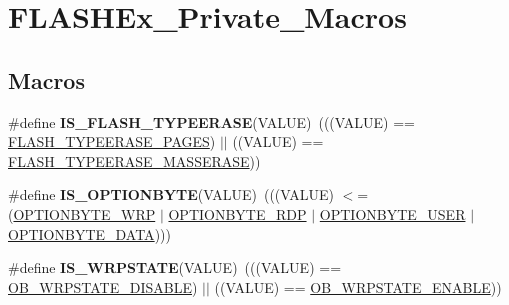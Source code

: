 \hypertarget{group___f_l_a_s_h_ex___private___macros}{}\section{F\+L\+A\+S\+H\+Ex\+\_\+\+Private\+\_\+\+Macros}
\label{group___f_l_a_s_h_ex___private___macros}
\subsection*{Macros}
\begin{DoxyCompactItemize}
\item 
\mbox{\label{group___f_l_a_s_h_ex___private___macros_gaf15a6822d2421a33b6857059348ab476}} 
\#define {\bfseries I\+S\+\_\+\+F\+L\+A\+S\+H\+\_\+\+T\+Y\+P\+E\+E\+R\+A\+SE}(V\+A\+L\+UE)~(((V\+A\+L\+UE) == \hyperlink{group___f_l_a_s_h_ex___type___erase_ga3664ce55155ec4990873c51737d787ce}{F\+L\+A\+S\+H\+\_\+\+T\+Y\+P\+E\+E\+R\+A\+S\+E\+\_\+\+P\+A\+G\+ES}) $\vert$$\vert$ ((V\+A\+L\+UE) == \hyperlink{group___f_l_a_s_h_ex___type___erase_ga9bc03534e69c625e1b4f0f05c3852243}{F\+L\+A\+S\+H\+\_\+\+T\+Y\+P\+E\+E\+R\+A\+S\+E\+\_\+\+M\+A\+S\+S\+E\+R\+A\+SE}))
\item 
\mbox{\label{group___f_l_a_s_h_ex___private___macros_ga87cd48c2373f47668470a38892ed07e3}} 
\#define {\bfseries I\+S\+\_\+\+O\+P\+T\+I\+O\+N\+B\+Y\+TE}(V\+A\+L\+UE)~(((V\+A\+L\+UE) $<$= (\hyperlink{group___f_l_a_s_h_ex___o_b___type_ga48712a166ea192ddcda0f2653679f9ec}{O\+P\+T\+I\+O\+N\+B\+Y\+T\+E\+\_\+\+W\+RP} $\vert$ \hyperlink{group___f_l_a_s_h_ex___o_b___type_ga8f0bdb21ef13bae39d5d8b6619e2df06}{O\+P\+T\+I\+O\+N\+B\+Y\+T\+E\+\_\+\+R\+DP} $\vert$ \hyperlink{group___f_l_a_s_h_ex___o_b___type_gac7d843e666e15c79688a1914e8ffe7a5}{O\+P\+T\+I\+O\+N\+B\+Y\+T\+E\+\_\+\+U\+S\+ER} $\vert$ \hyperlink{group___f_l_a_s_h_ex___o_b___type_gad0c29c84acfb46de1708a670529175a5}{O\+P\+T\+I\+O\+N\+B\+Y\+T\+E\+\_\+\+D\+A\+TA})))
\item 
\mbox{\label{group___f_l_a_s_h_ex___private___macros_ga8164622401a6cacf006679166de93c21}} 
\#define {\bfseries I\+S\+\_\+\+W\+R\+P\+S\+T\+A\+TE}(V\+A\+L\+UE)~(((V\+A\+L\+UE) == \hyperlink{group___f_l_a_s_h_ex___o_b___w_r_p___state_gaa34eb6205fe554f65a311ee974d5a4ab}{O\+B\+\_\+\+W\+R\+P\+S\+T\+A\+T\+E\+\_\+\+D\+I\+S\+A\+B\+LE}) $\vert$$\vert$ ((V\+A\+L\+UE) == \hyperlink{group___f_l_a_s_h_ex___o_b___w_r_p___state_ga9fc463145ab57616baa36d95523186a1}{O\+B\+\_\+\+W\+R\+P\+S\+T\+A\+T\+E\+\_\+\+E\+N\+A\+B\+LE}))

\end{DoxyCompactItemize}
